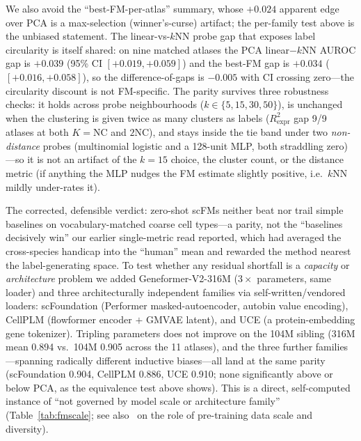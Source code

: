 \documentclass[fleqn,10pt,lineno]{wlpeerj}  %
\begin{document}
We also avoid the ``best-FM-per-atlas'' summary, whose $+0.024$ apparent edge over PCA is a max-selection (winner's-curse) artifact; the per-family test above is the unbiased statement. The linear-vs-$k$NN probe gap that exposes label circularity is itself shared: on nine matched atlases the PCA linear$-k$NN AUROC gap is $+0.039$ (95\% CI $[+0.019,+0.059]$) and the best-FM gap is $+0.034$ ($[+0.016,+0.058]$), so the difference-of-gaps is $-0.005$ with CI crossing zero---the circularity discount is not FM-specific. The parity survives three robustness checks: it holds across probe neighbourhoods ($k\in\{5,15,30,50\}$), is unchanged when the clustering is given twice as many clusters as labels ($R^2_{\mathrm{expr}}$ gap 9/9 atlases at both $K{=}\mathrm{NC}$ and $2\mathrm{NC}$), and stays inside the tie band under two \emph{non-distance} probes (multinomial logistic and a 128-unit MLP, both straddling zero)---so it is not an artifact of the $k{=}15$ choice, the cluster count, or the distance metric (if anything the MLP nudges the FM estimate slightly positive, i.e.\ $k$NN mildly under-rates it).

The corrected, defensible verdict: zero-shot scFMs neither beat nor trail simple baselines on vocabulary-matched coarse cell types---a parity, not the ``baselines decisively win'' our earlier single-metric read reported, which had averaged the cross-species handicap into the ``human'' mean and rewarded the method nearest the label-generating space. To test whether any residual shortfall is a \emph{capacity} or \emph{architecture} problem we added Geneformer-V2-316M ($3\times$ parameters, same loader) and three architecturally independent families via self-written/vendored loaders: scFoundation (Performer masked-autoencoder, autobin value encoding), CellPLM (flowformer encoder $+$ GMVAE latent), and UCE (a protein-embedding gene tokenizer). Tripling parameters does not improve on the 104M sibling (316M mean 0.894 vs.\ 104M 0.905 across the 11 atlases), and the three further families---spanning radically different inductive biases---all land at the same parity (scFoundation 0.904, CellPLM 0.886, UCE 0.910; none significantly above or below PCA, as the equivalence test above shows). This is a direct, self-computed instance of ``not governed by model scale or architecture family'' (Table~\ref{tab:fmscale}; see also~\cite{denadel2026} on the role of pre-training data scale and diversity).
\end{document}
